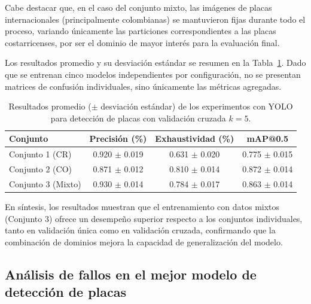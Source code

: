 Cabe destacar que, en el caso del conjunto mixto, 
las imágenes de placas internacionales (principalmente colombianas) se mantuvieron fijas durante todo el proceso, 
variando únicamente las particiones correspondientes a las placas costarricenses, 
por ser el dominio de mayor interés para la evaluación final.

Los resultados promedio y su desviación estándar se resumen en la Tabla~\ref{tab:yolo-metrics-kfold}. 
Dado que se entrenan cinco modelos independientes por configuración, 
no se presentan matrices de confusión individuales, 
sino únicamente las métricas agregadas.

\begin{table}[h]
	\centering
	\begin{tabular}{lccc}
		\toprule
		\textbf{Conjunto} & \textbf{Precisión (\%)} & \textbf{Exhaustividad (\%)} & \textbf{mAP@0.5} \\
		\midrule
		Conjunto 1 (CR)    & 0.920 $\pm$ 0.019 & 0.631 $\pm$ 0.020 & 0.775 $\pm$ 0.015 \\
		Conjunto 2 (CO)    & 0.871 $\pm$ 0.012 & 0.810 $\pm$ 0.014 & 0.872 $\pm$ 0.014 \\
		Conjunto 3 (Mixto) & 0.930 $\pm$ 0.014 & 0.784 $\pm$ 0.017 & 0.863 $\pm$ 0.014 \\
		\bottomrule
	\end{tabular}
	\caption{Resultados promedio ($\pm$ desviación estándar) de los experimentos con YOLO para detección de placas
	con validación cruzada $k=5$.}
	\label{tab:yolo-metrics-kfold}
\end{table}

En síntesis, los resultados muestran que el entrenamiento con datos mixtos 
(Conjunto 3) ofrece un desempeño superior respecto a los conjuntos individuales, 
tanto en validación única como en validación cruzada, 
confirmando que la combinación de dominios mejora la capacidad de generalización del modelo.

\subsection{Análisis de fallos en el mejor modelo de detección de placas}

